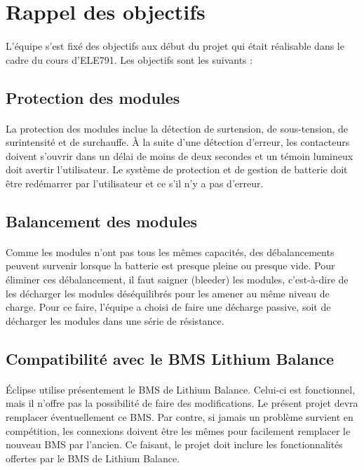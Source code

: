 \section{Rappel des objectifs}

	\paragraph{}
	L’équipe s’est fixé des objectifs aux début du projet qui était réalisable dans le cadre du cours d’ELE791. Les objectifs sont les suivants :

	\subsection{Protection des modules}
	
		\paragraph{}
		La protection des modules inclue la détection de surtension, de sous-tension, de surintensité et de surchauffe. À la suite d’une détection d’erreur, les contacteurs doivent s’ouvrir dans un délai de moins de deux secondes et un témoin lumineux doit avertir l’utilisateur. Le système de protection et de gestion de batterie doit être redémarrer par l’utilisateur et ce s’il n’y a pas d’erreur.

	\subsection{Balancement des modules}

		\paragraph{}
		Comme les modules n’ont pas tous les mêmes capacités, des débalancements peuvent survenir lorsque la batterie est presque pleine ou presque vide. Pour éliminer ces débalancement, il faut saigner (bleeder) les modules, c’est-à-dire de les décharger les modules déséquilibrés pour les amener au même niveau de charge. Pour ce faire, l’équipe a choisi de faire une décharge passive, soit de décharger les modules dans une série de résistance. 

	\subsection{Compatibilité avec le BMS Lithium Balance}

		\paragraph{}
		Éclipse utilise présentement le BMS de Lithium Balance. Celui-ci est fonctionnel, mais il n’offre pas la possibilité de faire des modifications. Le présent projet devra remplacer éventuellement ce BMS. Par contre, si jamais un problème survient en compétition, les connexions doivent être les mêmes pour facilement remplacer le nouveau BMS par l’ancien. Ce faisant, le projet doit inclure les fonctionnalités offertes par le BMS de Lithium Balance.

